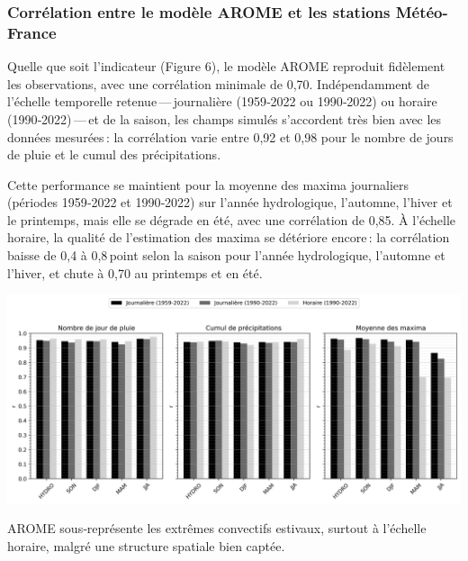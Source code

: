 \documentclass[
  article,
  nofooter,
  noheadings]{jss}
\begin{document}
\subsubsection{Corrélation entre le modèle AROME et les stations
Météo-France}\label{corruxe9lation-entre-le-moduxe8le-arome-et-les-stations-muxe9tuxe9o-france}

Quelle que soit l'indicateur (Figure 6), le modèle AROME reproduit
fidèlement les observations, avec une corrélation minimale de 0,70.
Indépendamment de l'échelle temporelle retenue\,---\,journalière
(1959‑2022 ou 1990‑2022) ou horaire (1990‑2022)\,---\,et de la saison,
les champs simulés s'accordent très bien avec les données mesurées\,: la
corrélation varie entre 0,92 et 0,98 pour le nombre de jours de pluie et
le cumul des précipitations.

Cette performance se maintient pour la moyenne des maxima journaliers
(périodes 1959‑2022 et 1990‑2022) sur l'année hydrologique, l'automne,
l'hiver et le printemps, mais elle se dégrade en été, avec une
corrélation de 0,85. À l'échelle horaire, la qualité de l'estimation des
maxima se détériore encore\,: la corrélation baisse de 0,4 à 0,8\,point
selon la saison pour l'année hydrologique, l'automne et l'hiver, et
chute à 0,70 au printemps et en été.

\includegraphics[width=1\linewidth,height=\textheight,keepaspectratio]{figures/histo_numday_mean_mean-max.png}


\begin{tcolorbox}[enhanced jigsaw, toprule=.15mm, bottomrule=.15mm, colback=white, breakable, left=2mm, leftrule=.75mm, colframe=quarto-callout-color-frame, arc=.35mm, rightrule=.15mm, opacityback=0]

AROME sous‑représente les extrêmes convectifs estivaux, surtout à
l'échelle horaire, malgré une structure spatiale bien captée.

\end{tcolorbox}
\end{document}

